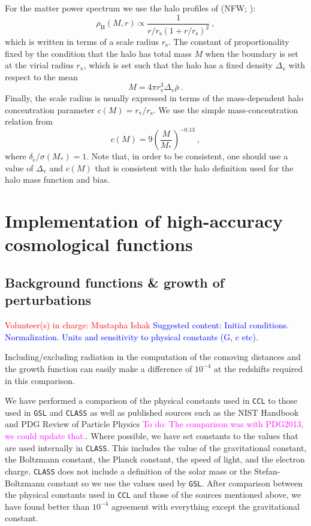 \documentclass[\docopts]{\docclass}
\newcommand{\todo}[1]{\textcolor{magenta}{To do: #1}}
\newcommand{\vol}[1]{\textcolor{red}{Volunteer(s) in charge: #1}}
\newcommand{\cont}[1]{\textcolor{blue}{Suggested content: #1}}
\newcommand{\ccl}{{\tt CCL}\xspace}
\begin{document}
For the matter power spectrum we use the halo profiles of \citeauthor*{Navarro1997} (NFW; \citeyear{Navarro1997}):
\begin{equation}
\rho_\mathrm{H}(M,r)\propto\frac{1}{r/r_\mathrm{s}(1+r/r_\mathrm{s})^2}\ ,
\label{eq:NFW_profile}
\end{equation}
which is written in terms of a scale radius $r_\mathrm{s}$. The constant of proportionality fixed by the condition that the halo has total mass $M$ when the boundary is set at the virial radius $r_\mathrm{v}$, which is set such that the halo has a fixed density $\Delta_\mathrm{v}$ with respect to the mean
\begin{equation}
M=4\pi r_\mathrm{v}^3\Delta_\mathrm{v}\bar\rho\ .
\label{eq:virial_radius}
\end{equation}
Finally, the scale radius is usually expressed in terms of the mass-dependent halo concentration parameter $c(M)=r_\mathrm{v}/r_\mathrm{s}$. We use the simple mass-concentration relation from \cite{Bullock2001}
\begin{equation}
c(M)=9\left(\frac{M}{M_*}\right)^{-0.13}\ ,
\end{equation}
where $\delta_\mathrm{c}/\sigma(M_*)=1$.
Note that, in order to be consistent, one should use a value of $\Delta_\mathrm{v}$ and $c(M)$ that is consistent with the halo definition used for the halo mass function and bias.

\section{Implementation of high-accuracy cosmological functions}

\subsection{Background functions \& growth of perturbations}
\vol{Mustapha Ishak}
\label{sec:distances}
\cont{Initial conditions. Normalization. Units and sensitivity to physical constants (G, c etc).}

Including/excluding radiation in the computation of the comoving distances and the growth function can easily make a difference of $10^{-4}$ at the redshifts required in this comparison.

We have performed a comparison of the physical constants used in \ccl to those used in {\tt GSL} and {\tt CLASS} as well as published sources such as the NIST Handbook and PDG Review of Particle Physics \todo{The comparison was with PDG2013, we could update that.}. Where possible, we have set constants to the values that are used internally in {\tt CLASS}. This includes the value of the gravitational constant, the Boltzmann constant, the Planck constant, the speed of light, and the electron charge. {\tt CLASS} does not include a definition of the solar mass or the Stefan-Boltzmann constant so we use the values used by {\tt GSL}. After comparison between the physical constants used in \ccl and those of the sources mentioned above, we have found better than $10^{-4}$ agreement with everything except the gravitational constant.
\end{document}
